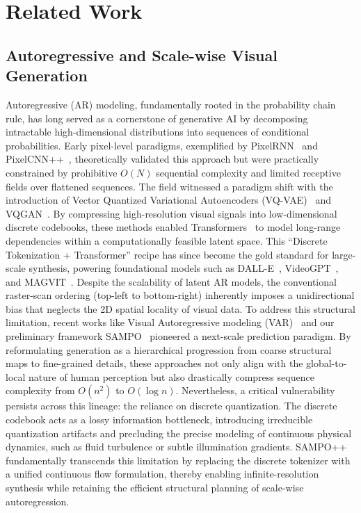 \section{Related Work}
\label{Sec2:RelatedWork}

\subsection{Autoregressive and Scale-wise Visual Generation}
Autoregressive (AR) modeling, fundamentally rooted in the probability chain rule, has long served as a cornerstone of generative AI by decomposing intractable high-dimensional distributions into sequences of conditional probabilities. Early pixel-level paradigms, exemplified by PixelRNN~\cite{van2016pixel} and PixelCNN++~\cite{salimans2017pixelcnn++}, theoretically validated this approach but were practically constrained by prohibitive $O(N)$ sequential complexity and limited receptive fields over flattened sequences. The field witnessed a paradigm shift with the introduction of Vector Quantized Variational Autoencoders (VQ-VAE)~\cite{van2017neural} and VQGAN~\cite{esser2021taming}. By compressing high-resolution visual signals into low-dimensional discrete codebooks, these methods enabled Transformers~\cite{vaswani2017attention} to model long-range dependencies within a computationally feasible latent space. This ``Discrete Tokenization + Transformer'' recipe has since become the gold standard for large-scale synthesis, powering foundational models such as DALL-E~\cite{ramesh2021zero}, VideoGPT~\cite{yan2021videogpt}, and MAGVIT~\cite{yu2023language}. Despite the scalability of latent AR models, the conventional raster-scan ordering (top-left to bottom-right) inherently imposes a unidirectional bias that neglects the 2D spatial locality of visual data. To address this structural limitation, recent works like Visual Autoregressive modeling (VAR)~\cite{tian2024visual} and our preliminary framework SAMPO~\cite{wang2025sampo} pioneered a next-scale prediction paradigm. By reformulating generation as a hierarchical progression from coarse structural maps to fine-grained details, these approaches not only align with the global-to-local nature of human perception but also drastically compress sequence complexity from $O(n^2)$ to $O(\log n)$. Nevertheless, a critical vulnerability persists across this lineage: the reliance on discrete quantization. The discrete codebook acts as a lossy information bottleneck, introducing irreducible quantization artifacts and precluding the precise modeling of continuous physical dynamics, such as fluid turbulence or subtle illumination gradients. SAMPO++ fundamentally transcends this limitation by replacing the discrete tokenizer with a unified continuous flow formulation, thereby enabling infinite-resolution synthesis while retaining the efficient structural planning of scale-wise autoregression.


